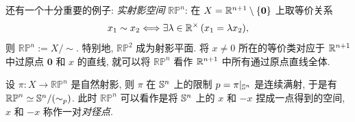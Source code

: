     \begin{Example}
        还有一个十分重要的例子: \emph{实射影空间} $ \mathbb{RP}^n $: 在 $ X=\R^{n+1}\sm\set{\mathbf{0}} $ 上取等价关系
        \[
            x_1\sim x_2\Longleftrightarrow\exists\lambda\in\R^\times\,(x_1=\lambda x_2),
        \]
        则 $ \mathbb{RP}^n:=X/\sim $. 特别地, $ \mathbb{RP}^2 $ 成为射影平面. 将 $ x\ne 0 $ 所在的等价类对应于 $ \R^{n+1} $ 中过原点 $ \mathbf{0} $ 和 $ x $ 的直线, 就可以将 $ \mathbb{RP}^n $ 看作 $ \R^{n+1} $ 中所有通过原点直线全体.

        设 $ \pi : X\to\mathbb{RP}^n $ 是自然射影, 则 $ \pi $ 在 $ \S^n $ 上的限制 $ p=\pi|_{\S^n} $ 是连续满射, 于是有 $ \mathbb{RP}^n\simeq\S^n/(\sim_p) $. 此时 $ \mathbb{RP}^n $ 可以看作是将 $ \S^n $ 上的 $ x $ 和 $ -x $ 捏成一点得到的空间, $ x $ 和 $ -x $ 称作一对\emph{对径点}.
    \end{Example}